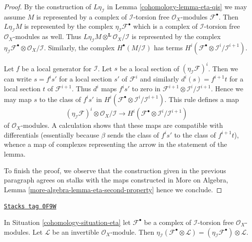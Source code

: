\begin{proof}

By the construction of $L\eta_\mathcal{I}$ in Lemma \ref{cohomology-lemma-eta-qis}
we may assume $M$ is represented by a complex of $\mathcal{I}$-torsion
free $\mathcal{O}_X$-modules $\mathcal{F}^\bullet$. Then
$L\eta_\mathcal{I}M$ is represented by the complex
$\eta_\mathcal{I}\mathcal{F}^\bullet$ which is a
complex of $\mathcal{I}$-torsion free $\mathcal{O}_X$-modules as well.
Thus $L\eta_\mathcal{I}M \otimes^\mathbf{L} \mathcal{O}_X/\mathcal{I}$
is represented by the complex
$\eta_\mathcal{I}\mathcal{F}^\bullet \otimes \mathcal{O}_X/\mathcal{I}$.
Similarly, the complex $H^\bullet(M/\mathcal{I})$ has terms
$H^i(\mathcal{F}^\bullet \otimes \mathcal{I}^i/\mathcal{I}^{i + 1})$.

\medskip\noindent
Let $f$ be a local generator for $\mathcal{I}$.
Let $s$ be a local section of $(\eta_\mathcal{I}\mathcal{F})^i$.
Then we can write $s = f^is'$ for a local section $s'$ of
$\mathcal{F}^i$ and similarly $d^i(s) = f^{i + 1}t$ for a local
section $t$ of $\mathcal{F}^{i + 1}$. Thus $d^i$ maps $f^is'$
to zero in $\mathcal{F}^{i + 1} \otimes \mathcal{I}^i/\mathcal{I}^{i + 1}$.
Hence we may map $s$ to the class of $f^is'$ in
$H^i(\mathcal{F}^\bullet \otimes \mathcal{I}^i/\mathcal{I}^{i + 1})$.
This rule defines a map
$$
(\eta_\mathcal{I}\mathcal{F})^i \otimes \mathcal{O}_X/\mathcal{I}
\longrightarrow
H^i(\mathcal{F}^\bullet \otimes \mathcal{I}^i/\mathcal{I}^{i + 1})
$$
of $\mathcal{O}_X$-modules. A calculation shows that these maps
are compatible with differentials (essentially because $\beta$
sends the class of $f^is'$ to the class of $f^{i + 1}t$), whence
a map of complexes representing the arrow in the statement of the lemma.

\medskip\noindent
To finish the proof, we observe that the construction given
in the previous paragraph agrees on stalks with the maps
constructed in More on Algebra, Lemma
\ref{more-algebra-lemma-eta-second-property}
hence we conclude.
\end{proof}

\begin{lemma}
\label{cohomology-lemma-eta-tensor-invertible}
\href{https://stacks.math.columbia.edu/tag/0F9W}{\texttt{Stacks tag 0F9W}}

In Situation \ref{cohomology-situation-eta}
let $\mathcal{F}^\bullet$ be a complex of
$\mathcal{I}$-torsion free $\mathcal{O}_X$-modules.
Let $\mathcal{L}$ be an invertible $\mathcal{O}_X$-module.
Then $\eta_\mathcal{I}(\mathcal{F}^\bullet \otimes \mathcal{L}) =
(\eta_\mathcal{I}\mathcal{F}^\bullet) \otimes \mathcal{L}$.
\end{lemma}

